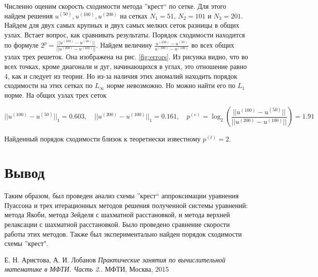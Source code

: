 \documentclass[report , a4paper, onecolumn, 12pt]{article}
\begin{document}
Численно оценим скорость сходимости метода ''крест`` по сетке. Для этого найдем решения $u^{(50)}, u^{(100)}, u^{(200)}$ на сетках  $N_1 = 51$, $N_2 = 101$ и $N_3 = 201$. Найдем для двух самых крупных и двух самых мелких сеток разницы в общих узлах. Встает вопрос, как сравнивать результаты. Порядок сходимости находится по формуле $2^p = \frac{||u^{(100)}-u^{(50)}||}{||u^{(200)} - u^{(100)}||}$. Найдем величину $\frac{u^{(100)} - u^{(50)}}{u^{(200)} - u^{(100)}}$ во всех общих узлах трех решеток. Она изображена на рис. \ref{fig:errors}. Из рисунка видно, что во всех точках, кроме диагонали и дуг, начинающихся в углах, это отношение равно 4, как и следует из теории. Но из-за наличия этих аномалий находить порядок сходимости на этих сетках по $L_\infty$ норме невозможно. Но можно найти его по $L_1$ норме. На общих узлах трех сеток

\begin{equation}
 ||u^{(100)} - u^{(50)}||_1 = 0.603, \quad  ||u^{(200)} - u^{(100)}||_1 = 0.161, \quad p^{(e)}=\log_2\left(\frac{||u^{(100)}-u^{(50)}||}{||u^{(200)} - u^{(100)}||}\right)=1.91
\end{equation}

Найденный порядок сходимости близок к теоретиески известному $p^{(t)} = 2$.

\section{Вывод}

Таким образом, был проведен анализ схемы ''крест`` аппроксимации уравнения Пуассона и трех итерационных методов решения полученной системы уравнений: метода Якоби, метода Зейделя с шахматной расстановкой, и метода верхней релаксации с шахматной расстановкой. Было проведено сравнение скорости работы этих методов. Также был экспериментально найден порядок сходимости схемы ''крест". 

\begin{thebibliography}{9}
Е. Н. Аристова, А. И. Лобанов
\textit{Практические занятия по вычислительной математике в МФТИ. Часть 2.}. 
МФТИ, Москва, 2015

\end{thebibliography}
\end{document}
